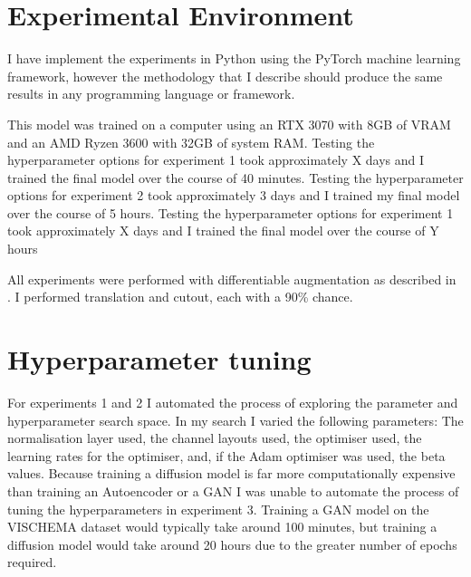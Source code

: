 \documentclass{UoYCSproject}
\begin{document}


\section{Experimental Environment}

I have implement the experiments in Python using the PyTorch machine learning framework, however the methodology that I describe should produce the same results in any programming language or framework.

This model was trained on a computer using an RTX 3070 with 8GB of VRAM and an AMD Ryzen 3600 with 32GB of system RAM.
Testing the hyperparameter options for experiment 1 took approximately X days and I trained the final model over the course of 40 minutes.
Testing the hyperparameter options for experiment 2 took approximately 3 days and I trained my final model over the course of 5 hours.
Testing the hyperparameter options for experiment 1 took approximately X days and I trained the final model over the course of Y hours

All experiments were performed with differentiable augmentation as described in \cite{zhao2020differentiable}. I performed translation and cutout, each with a 90\% chance.

\section{Hyperparameter tuning}

For experiments 1 and 2 I automated the process of exploring the parameter and hyperparameter search space. In my search I varied the following parameters: The normalisation layer used, the channel layouts used, the optimiser used, the learning rates for the optimiser, and, if the Adam optimiser was used, the beta values. Because training a diffusion model is far more computationally expensive than training an Autoencoder or a GAN I was unable to automate the process of tuning the hyperparameters in experiment 3. Training a GAN model on the VISCHEMA dataset would typically take around 100 minutes, but training a diffusion model would take around 20 hours due to the greater number of epochs required.
\end{document}
